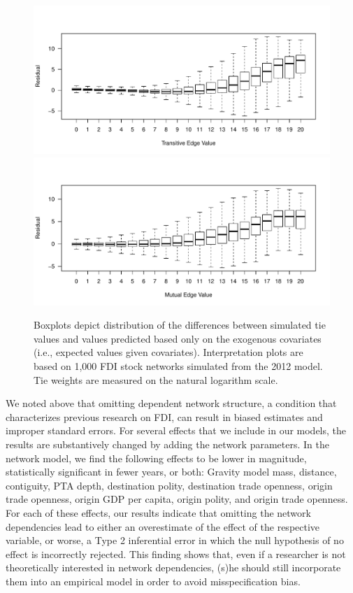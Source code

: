 \documentclass{article}
\begin{document}
\begin{figure}[htp]
\centering
\includegraphics[scale=.75]{draft_figures/transitiveBoxplot.pdf} \vspace{-.5cm}\\
\includegraphics[scale=.75]{draft_figures/mutualBoxplot.pdf} \vspace{-.5cm}
\caption{\label{fig:interpret} Boxplots depict distribution of the differences between simulated tie values and values predicted based only on the exogenous covariates (i.e., expected values given covariates). Interpretation plots are based on 1,000 FDI stock networks simulated from the 2012 model. Tie weights are measured on the natural logarithm scale. }
\end{figure}



We noted above that omitting dependent network structure, a condition that characterizes previous research on FDI, can result in biased estimates and improper standard errors. For several effects that we include in our models, the results are substantively changed by adding the network parameters. In the network model, we find the following effects to be lower in magnitude, statistically significant in fewer years, or both: Gravity model mass, distance, contiguity, PTA depth, destination polity, destination trade openness, origin trade openness, origin GDP per capita, origin polity, and origin trade openness. For each of these effects, our results indicate that omitting the network dependencies lead to either an overestimate of the effect of the respective variable, or worse, a Type 2 inferential error in which the null hypothesis of no effect is incorrectly rejected. This finding shows that, even if a researcher is not theoretically interested in network dependencies, (s)he should still incorporate them into an empirical model in order to avoid misspecification bias.
\end{document}
